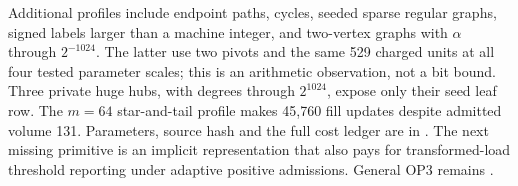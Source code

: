 Additional profiles include endpoint paths, cycles, seeded sparse regular
graphs, signed labels larger than a machine integer, and two-vertex graphs
with $\alpha$ through $2^{-1024}$. The latter use two pivots and the same
529 charged units at all four tested parameter scales; this is an arithmetic
observation, not a bit bound. Three private huge hubs, with degrees through
$2^{1024}$, expose only their seed leaf row. The $m=64$ star-and-tail
profile makes 45,760 fill updates despite admitted volume 131. Parameters,
source hash and the full cost ledger are in .
The next missing primitive is an implicit representation that also pays for
transformed-load threshold reporting under adaptive positive admissions.
General OP3 remains \statusopen.
